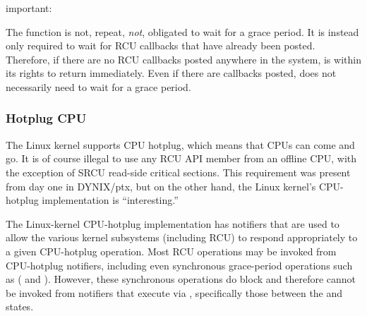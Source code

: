 \begin{Note}
   important:

   The  function is not, repeat,
   \emph{not}, obligated to wait for a grace period.
   It is instead only required
   to wait for RCU callbacks that have already been posted.
   Therefore, if
   there are no RCU callbacks posted anywhere in the system,
    is within its rights to return immediately.
   Even if
   there are callbacks posted,  does not necessarily need
   to wait for a grace period.
\end{Note}

\QuickQuizEnd


\subsubsection{Hotplug CPU}

The Linux kernel supports CPU hotplug, which means that CPUs can come
and go.
It is of course illegal to use any RCU API member from an
offline CPU, with the exception of SRCU %
read-side
critical sections.
This requirement was present from day one in
DYNIX/ptx, but on the other hand, the Linux kernel's CPU-hotplug
implementation is ``interesting.''

The Linux-kernel CPU-hotplug implementation has notifiers that are used
to allow the various kernel subsystems (including RCU) to respond
appropriately to a given CPU-hotplug operation.
Most RCU operations may
be invoked from CPU-hotplug notifiers, including even synchronous
grace-period operations such as ( and
).
However, these synchronous operations
do block and therefore cannot be invoked from notifiers that execute via
, specifically those between the 
and  states.

